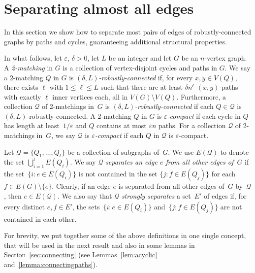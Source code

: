\documentclass[a4paper, 11pt,reqno]{amsart}
\newcommand{\calQ}{\mathcal{Q}}
\theoremstyle{plain}
\theoremstyle{definition}
\numberwithin{equation}{section}
\newcommand{\eps}{\varepsilon}
\begin{document}
\section{Separating almost all edges} \label{section:almostall}

In this section we show how to separate most pairs of edges of
robustly-connected graphs by paths and cycles, guaranteeing additional
structural properties.

In what follows, let $\eps$, $\delta > 0$, let $L$ be an integer and
let $G$ be an $n$-vertex graph.
A \emph{2-matching} in $G$ is a collection of vertex-disjoint
cycles and paths in $G$. We say a $2$-matching $Q$ in $G$ is
\emph{$(\delta, L)$-robustly-connected} if, for every $x, y \in V(Q)$,
there exists $\ell$ with $1 \leq \ell \leq L$ such that there are at least $\delta
n^\ell$ $(x,y)$-paths with exactly $\ell$ inner vertices each, all in
$V(G) \setminus V(Q)$.  Furthermore, a collection $\calQ$ of
2-matchings in~$G$ is \emph{$(\delta, L)$-robustly-connected} if each
$Q\in\calQ$ is $(\delta, L)$-robustly-connected.  A 2-matching $Q$ in
$G$ is \emph{$\eps$-compact} if each cycle in $Q$ has length at
least~$1/\eps$ and $Q$ contains at most $\eps n$ paths.  For a
collection $\calQ$ of 2-matchings in~$G$, we say $\calQ$ is
\emph{$\eps$-compact} if each $Q$ in $\calQ$ is $\eps$-compact.


Let $\calQ = \{Q_1, \dotsc, Q_t\}$ be a collection of subgraphs of~$G$.  
We use $E(\calQ)$ to denote the set $\bigcup_{i=1}^t E(Q_i)$.  We say 
$\calQ$ \emph{separates an edge $e$ from all other edges of~$G$} if the 
set~$\{ i : e \in E(Q_i) \}$ is not contained in the set $\{ j : f \in E(Q_j) \}$ 
for each $f \in E(G) \setminus \{e\}$.  Clearly, if an edge $e$ is 
separated from all other edges of~$G$ by~$\calQ$, then $e \in E(\calQ)$.  
We also say that $\calQ$ \emph{strongly separates} a set~$E'$ of edges if, 
for every distinct $e,f \in E'$, the sets~$\{ i : e \in E(Q_i) \}$ 
and~$\{ j : f \in E(Q_j) \}$ are not contained in each other.

For brevity, we put together some of the above definitions in one
single concept, that will be used in the next result and also in some
lemmas in Section~\ref{sec:connecting} (see Lemmas~\ref{lem:acyclic}
and~\ref{lemma:connectingpaths}).
\end{document}
